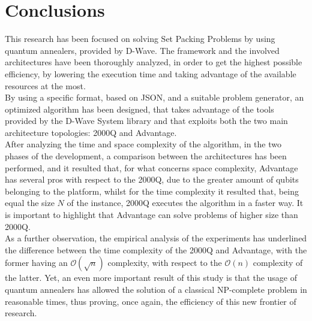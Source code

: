 \documentclass[oneside,a4paper]{article}
\begin{document}
\section{Conclusions}
This research has been focused on solving Set Packing Problems by using quantum annealers, provided by D-Wave. The framework and the involved architectures have been thoroughly analyzed, in order to get the highest possible efficiency, by lowering the execution time and taking advantage of the available resources at the most. 
\\
By using a specific format, based on JSON, and a suitable problem generator, an optimized algorithm has been designed, that takes advantage of the tools provided by the D-Wave System library and that exploits both the two main architecture topologies: 2000Q and Advantage.
\\
After analyzing the time and space complexity of the algorithm, in the two phases of the development, a comparison between the architectures has been performed, and it resulted that, for what concerns space complexity, Advantage has several pros with respect to the 2000Q, due to the greater amount of qubits belonging to the platform, whilst for the time complexity it resulted that, being equal the size $N$ of the instance, 2000Q executes the algorithm in a faster way. It is important to highlight that Advantage can solve problems of higher size than 2000Q.
\\
As a further observation, the empirical analysis of the experiments has underlined the difference between the time complexity of the 2000Q and Advantage, with the former having an $\mathcal{O}(\sqrt{n})$ complexity, with respect to the $\mathcal{O}(n)$ complexity of the latter. Yet, an even more important result of this study is that the usage of quantum annealers has allowed the solution of a classical NP-complete problem in reasonable times, thus proving, once again, the efficiency of this new frontier of research.



\end{document}
